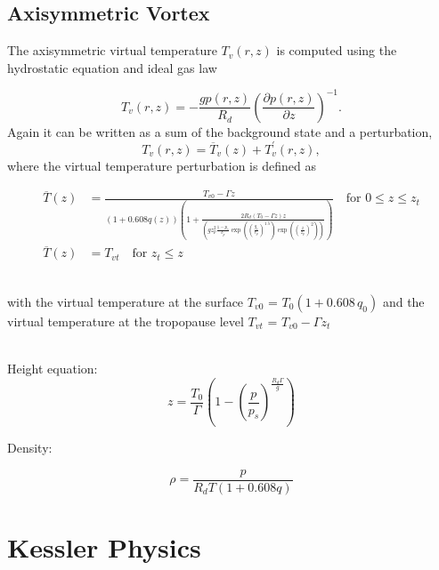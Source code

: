 \documentclass{article}
\begin{document}
\subsection*{Axisymmetric Vortex}

The axisymmetric virtual temperature $T_v(r,z)$ is computed using the hydrostatic equation and ideal gas law


\begin{equation}
T_v(r,z) = -\frac{g p(r,z)}{R_d} \left( \frac{\partial p(r,z)}{ \partial z} \right)^{-1}.
\end{equation}  Again it can be written as a sum of the background state and a perturbation,
\begin{equation} \label{eq:virt_temp}
T_v(r,z) = \overline{T}_v(z) + T_v^\prime(r,z),
\end{equation} where the virtual temperature perturbation is defined as


\begin{equation}
\begin{split}
\overline{T}(z)&=\frac{T_{v0}-\Gamma z}{(1+0.608q(z))\left(1+\frac{2R_d(T_0-\Gamma z)z}{\left( g z_p^2\frac{1-p_s}{\delta_p}\exp\left(\left(\frac{g_r}{r_p}\right)^{1.5}\right)\exp\left(\left(\frac{z}{z_p}\right)^2\right) \right)}   \right)} \text{ ~~for   } 0 \leq z \leq z_t \\
\overline{T}(z)&=T_{vt}  \text{ ~~for   }  z_t \leq z
\end{split}
\end{equation}

~\\with the virtual temperature at the surface $T_{v0}$ = $T_0 (1+0.608 \, q_0)$ and the virtual temperature at the tropopause level $T_{vt}$ = $T_{v0} - \Gamma z_t$

~\\Height equation:
\begin{equation}
z=\frac{T_0}{\Gamma}\left(1-\left(\frac{p}{p_s}\right) ^{\frac{R_d\Gamma}{g}}\right)
\end{equation}




Density:

\begin{equation}
\rho=\frac{p}{R_dT(1+0.608q)}
\end{equation}


\clearpage
\section{Kessler Physics}
\end{document}
